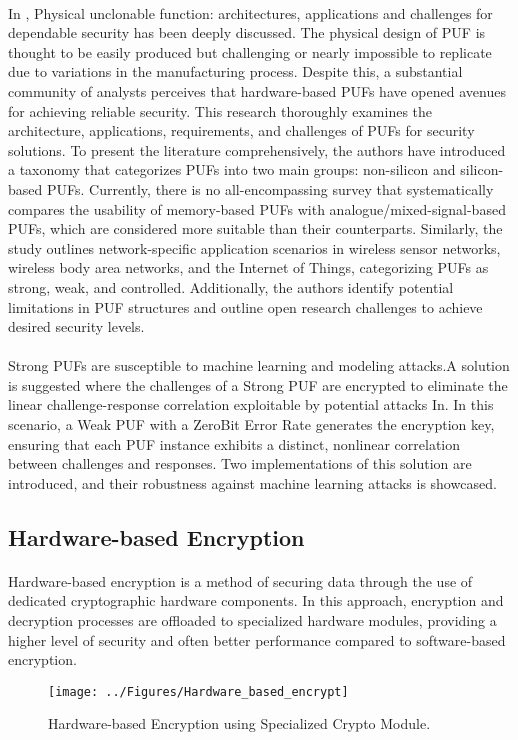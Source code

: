  \paragraph*{}
 In \cite{https://doi.org/10.1049/iet-cds.2019.0175}, Physical unclonable function: architectures, applications and challenges for dependable security has been deeply discussed. The physical design of PUF is thought to be easily produced but challenging or nearly impossible to replicate due to variations in the manufacturing process. Despite this, a substantial community of analysts perceives that hardware-based PUFs have opened avenues for achieving reliable security. This research thoroughly examines the architecture, applications, requirements, and challenges of PUFs for security solutions. To present the literature comprehensively, the authors have introduced a taxonomy that categorizes PUFs into two main groups: non-silicon and silicon-based PUFs. Currently, there is no all-encompassing survey that systematically compares the usability of memory-based PUFs with analogue/mixed-signal-based PUFs, which are considered more suitable than their counterparts. Similarly, the study outlines network-specific application scenarios in wireless sensor networks, wireless body area networks, and the Internet of Things, categorizing PUFs as strong, weak, and controlled. Additionally, the authors identify potential limitations in PUF structures and outline open research challenges to achieve desired security levels.
 \paragraph*{}
 Strong PUFs are susceptible to machine learning and modeling attacks.A solution is suggested where the challenges of a Strong PUF are encrypted to eliminate the linear challenge-response correlation exploitable by potential attacks In\cite{8854387}. In this scenario, a Weak PUF with a ZeroBit Error Rate generates the encryption key, ensuring that each PUF instance exhibits a distinct, nonlinear correlation between challenges and responses. Two implementations of this solution are introduced, and their robustness against machine learning attacks is showcased. 
 \subsection{Hardware-based Encryption}
 \paragraph*{}
 Hardware-based encryption is a method of securing data through the use of dedicated cryptographic hardware components. In this approach, encryption and decryption processes are offloaded to specialized hardware modules, providing a higher level of security and often better performance compared to software-based encryption.
 \begin{figure}[h]
 	\centering
 	\texttt{[image: ../Figures/Hardware\_based\_encrypt]}
 	\caption{Hardware-based Encryption using Specialized Crypto Module.}
 	\label{fig:hardwarebasedencrypt}
 \end{figure}
 
